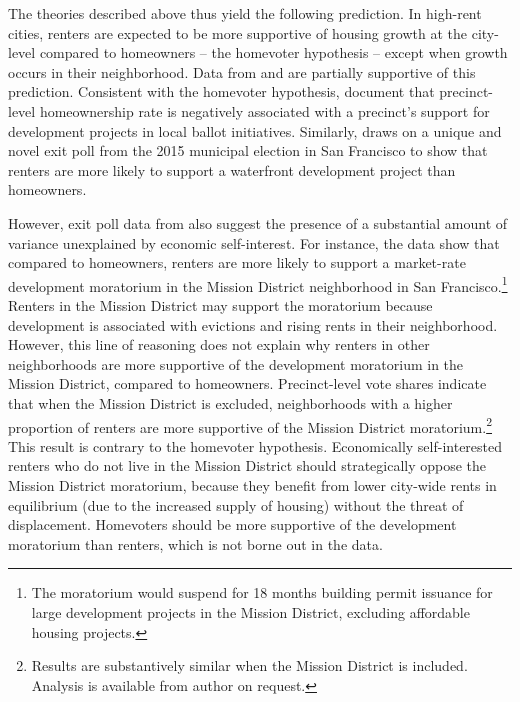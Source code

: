 \documentclass[article,11pt]{memoir}
\begin{document}
The theories described above thus yield the following prediction. In high-rent cities, renters are expected to be more supportive of housing growth at the city-level compared to homeowners -- the homevoter hypothesis -- except when growth occurs in their neighborhood. Data from \cite{gerber_development_2003} and \cite{hankinson_when_2018} are partially supportive of this prediction. Consistent with the homevoter hypothesis, \citeauthor{gerber_development_2003} document that precinct-level homeownership rate is negatively associated with a precinct's support for development projects in local ballot initiatives. Similarly, \citeauthor{hankinson_when_2018} draws on a unique and novel exit poll from the 2015 municipal election in San Francisco to show that renters are more likely to support a waterfront development project than homeowners. 

However, exit poll data from \cite{hankinson_when_2018} also suggest the presence of a substantial amount of variance unexplained by economic self-interest. For instance, the data show that compared to homeowners, renters are more likely to support a market-rate development moratorium in the Mission District neighborhood in San Francisco.\footnote{The moratorium would suspend for 18 months building permit issuance for large development projects in the Mission District, excluding affordable housing projects.} Renters in the Mission District may support the moratorium because development is associated with evictions and rising rents in their neighborhood. However, this line of reasoning does not explain why renters in other neighborhoods are more supportive of the development moratorium in the Mission District, compared to homeowners. Precinct-level vote shares indicate that when the Mission District is excluded, neighborhoods with a higher proportion of renters are more supportive of the Mission District moratorium.\footnote{Results are substantively similar when the Mission District is included. Analysis is available from author on request.}  This result is contrary to the homevoter hypothesis. Economically self-interested renters who do not live in the Mission District should strategically oppose the Mission District moratorium, because they benefit from lower city-wide rents in equilibrium (due to the increased supply of housing) without the threat of displacement. Homevoters should be more supportive of the development moratorium than renters, which is not borne out in the data.
\end{document}
